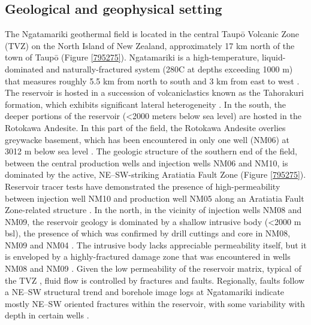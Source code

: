 \subsection{Geological and geophysical setting} \label{Setting}
The Ngatamariki geothermal field is located in the central Taup\={o} Volcanic Zone (TVZ) on the North Island of New Zealand, approximately 17 km north of the town of Taup\={o} (Figure \ref{795275}). Ngatamariki is a high-temperature, liquid-dominated and naturally-fractured system (280\textdegree{}C at depths exceeding 1000 m) that measures roughly 5.5 km from north to south and 3 km from east to west \citep{Bignall_2009,Chambefort_2014}. The reservoir is hosted in a succession of volcaniclastics known as the Tahorakuri formation, which exhibits significant lateral heterogeneity \citep{Chambefort_2014}. In the south, the deeper portions of the reservoir (\textless2000 meters below sea level) are hosted in the Rotokawa Andesite. In this part of the field, the Rotokawa Andesite overlies greywacke basement, which has been encountered in only one well (NM06) at 3012 m below sea level \citep{Chambefort_2014}. The geologic structure of the southern end of the field, between the central production wells and injection wells NM06 and NM10, is dominated by the active, NE--SW-striking Aratiatia Fault Zone (Figure \ref{795275}). Reservoir tracer tests have demonstrated the presence of high-permeability between injection well NM10 and production well NM05 along an Aratiatia Fault Zone-related structure \citep{buscarlet_2015}. In the north, in the vicinity of injection wells NM08 and NM09, the reservoir geology is dominated by a shallow intrusive body (\textless 2000 m bsl), the presence of which was confirmed by drill cuttings and core in NM08, NM09 and NM04 \citep{Bignall_2009,Chambefort_2014}. The intrusive body lacks appreciable \gls{permeability} itself, but it is enveloped by a highly-fractured damage zone that was encountered in wells NM08 and NM09 \citep{Clearwater_2015}. Given the low permeability of the reservoir matrix, typical of the TVZ \citep{Sibson_2003}, fluid flow is controlled by fractures and faults. Regionally, faults follow a NE--SW structural trend and borehole image logs at Ngatamariki indicate mostly NE--SW oriented fractures within the reservoir, with some variability with depth in certain wells \citep{Bignall_2009,Massiot_2015,massiot_2012}.

